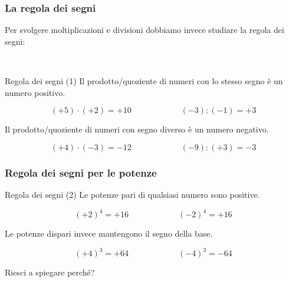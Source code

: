 \documentclass[handout]{beamer}
\theoremstyle{plain}
\begin{document}
\begin{frame}
\frametitle{La regola dei segni}
Per svolgere moltiplicazioni e divisioni dobbiamo invece studiare la regola dei segni:

~

\begin{block}{Regola dei segni (1)}
  Il prodotto/quoziente di numeri con lo \alert{stesso segno} è un numero \alert{positivo}.

  \[ (+5)\cdot(+2) = +10 \qquad\qquad\qquad (-3):(-1) = +3\]\pause

  Il prodotto/quoziente di numeri con \alert{segno diverso} è un numero \alert{negativo}. 

  \[ (+4)\cdot(-3) = -12 \qquad\qquad\qquad (-9):(+3) = -3\]
\end{block}
\end{frame}

\begin{frame}
\frametitle{Regola dei segni per le potenze} 
\begin{block}{Regola dei segni (2)}
  Le \alert{potenze pari} di qualsiasi numero \alert{sono positive}.

  \[ (+2)^4 = +16 \qquad\qquad\qquad (-2)^4 = +16 \]\pause

  Le \alert{potenze dispari} invece \alert{mantengono il segno della base}.

  \[ (+4)^3 = +64 \qquad\qquad\qquad (-4)^3 = -64 \]
\end{block}\pause

Riesci a spiegare perché?
\end{frame}
\end{document}
